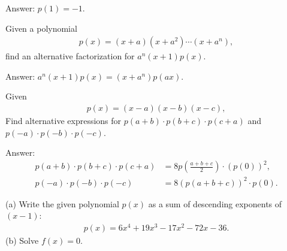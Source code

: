\begin{solution}[name=Solution by Parviz Shahriari]
Answer: $p(1)=-1$.
\end{solution}



\begin{tcolorbox}
\begin{question}
Given a polynomial
\begin{align*}
    p(x)=(x+a)(x+a^2)\cdots (x+a^n),
\end{align*}
find an alternative factorization for $a^n(x+1)p(x)$.
\end{question}
\end{tcolorbox}

\begin{solution}[name=Solution by Parviz Shahriari]
Answer: $a^n(x+1)p(x) = (x+a^n)p(ax)$.
\end{solution}



\begin{tcolorbox}
\begin{question}
Given
\begin{align*}
    p(x) = (x-a)(x-b)(x-c),
\end{align*}
Find alternative expressions for $p(a+b)\cdot p(b+c) \cdot p(c+a)$ and $p(-a)\cdot p(-b) \cdot p(-c)$.
\end{question}
\end{tcolorbox}

\begin{solution}[name=Solution by Parviz Shahriari]
Answer: 
\begin{align*}
    p(a+b)\cdot p(b+c) \cdot p(c+a) &= 8 p\left(\frac{a+b+c}{2}\right) \cdot \left(p(0)\right)^2,\\
    p(-a)\cdot p(-b) \cdot p(-c) &= 8\left(p(a+b+c)\right)^2\cdot p(0).
\end{align*}
\end{solution}




\begin{tcolorbox}
\begin{question}
(a) Write the given polynomial $p(x)$ as a sum of descending exponents of $(x-1)$:
\begin{align*}
    p(x) = 6x^4 + 19x^3 - 17x^2 -72x - 36.
\end{align*}
(b) Solve $f(x)=0$.
\end{question}
\end{tcolorbox}

